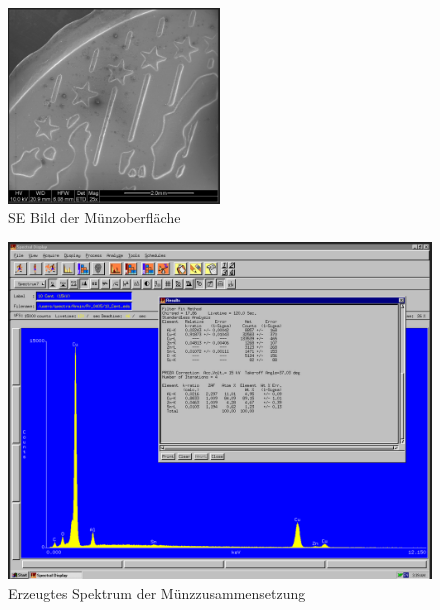 \documentclass[12pt,english,ngerman]{scrartcl}
\begin{document}
\begin{figure}[H]
	\begin{center}
		\includegraphics[width =0.5\textwidth]{./figures/munze.png}
	\end{center}
	\caption{SE Bild der Münzoberfläche~\cite{sein_foto}
	}\label{fig:munze}
\end{figure}

\begin{figure}[H]
	\begin{center}
		\includegraphics[width =\textwidth]{./figures/qualitativ1.png}
	\end{center}
	\caption{Erzeugtes Spektrum der Münzzusammensetzung~\cite{sein_foto}
	}\label{fig:qualitativ1}
\end{figure}
\end{document}
